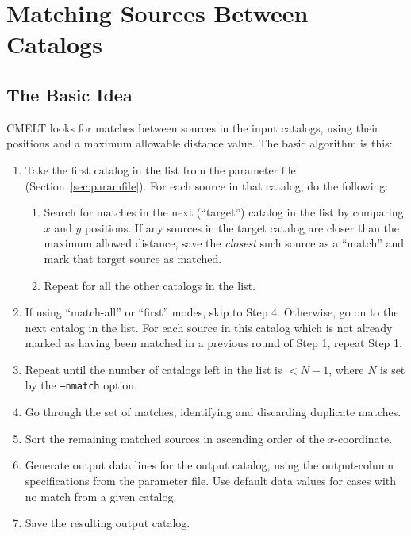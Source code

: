 \documentclass[10pt]{article}
\begin{document}
\section{Matching Sources Between Catalogs}

\subsection{The Basic Idea}

CMELT looks for matches between sources in the input catalogs, using 
their positions and a maximum allowable distance value.  The basic 
algorithm is this:

\begin{enumerate}
  
  \item Take the first catalog in the list from the parameter file
  (Section~\ref{sec:paramfile}).  For each source in that catalog, do
  the following:
  
  \begin{enumerate}
    
    \item Search for matches in the next (``target'') catalog in the list by 
    comparing $x$ and $y$ positions.  If any sources in the target 
    catalog are closer than the maximum allowed distance, save the 
    \textit{closest} such source as a ``match'' and mark that target 
    source as matched.
    
    \item Repeat for all the other catalogs in the list.
  \end{enumerate}
  
  \item If using ``match-all'' or ``first'' modes, skip to Step 4.
  Otherwise, go on to the next catalog in the list.  For each source
  in this catalog which is not already marked as having been matched
  in a previous round of Step 1, repeat Step 1.
  
  \item Repeat until the number of catalogs left in the list is $< 
  N - 1$, where $N$ is set by the \texttt{--nmatch} option.
  
  \item Go through the set of matches, identifying and discarding 
  duplicate matches.
  
  \item Sort the remaining matched sources in ascending order of the 
  $x$-coordinate.
  
  \item Generate output data lines for the output catalog, using the 
  output-column specifications from the parameter file.  Use default 
  data values for cases with no match from a given catalog.
  
  \item Save the resulting output catalog.
\end{enumerate}
\end{document}
